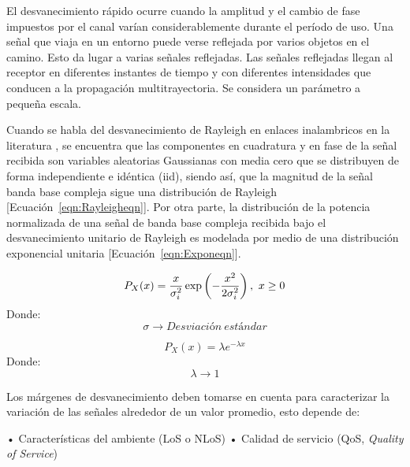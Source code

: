 El desvanecimiento rápido ocurre cuando la amplitud y el cambio de fase impuestos por el canal varían considerablemente durante el período de uso. Una señal que viaja en un entorno puede verse reflejada por varios objetos en el camino. Esto da lugar a varias señales reflejadas. Las señales reflejadas llegan al receptor en diferentes instantes de tiempo y con diferentes intensidades que conducen a la propagación multitrayectoria. Se considera un parámetro a pequeña escala.\newline

Cuando se habla del desvanecimiento de Rayleigh en enlaces inalambricos en la literatura \parencite{RayleighScienceDirect}, se encuentra que las componentes en cuadratura y en fase de la señal recibida son variables aleatorias Gaussianas con media cero que se distribuyen de forma independiente e idéntica (iid), siendo así, que la magnitud de la señal banda base compleja sigue una distribución de Rayleigh [Ecuación~\ref{eqn:Rayleigheqn}]. Por otra parte, la distribución de la potencia normalizada de una señal de banda base compleja recibida bajo el desvanecimiento unitario de Rayleigh es modelada por medio de una distribución exponencial unitaria [Ecuación~\ref{eqn:Exponeqn}]. \label{DesvRayleigC2} \newline 

\begin{equation}
    P_{X}(x) = {x\over\sigma_{i}^{2}}\exp\left(-{x^{2}\over 2\sigma_{i}^{2}}\right),\ x\geq 0
    \label{eqn:Rayleigheqn}
\end{equation}
Donde:
\[\sigma\to Desviación\ estándar\] 

\begin{equation}
    P_{X}(x)=\lambda e^{-\lambda x}
    \label{eqn:Exponeqn}
\end{equation}
Donde:
\[\lambda\to 1\] 

Los márgenes de desvanecimiento deben tomarse en cuenta para caracterizar la variación de las señales alrededor de un valor promedio, esto depende de:\newline

•	Características del ambiente (LoS o NLoS)\newline
•	Calidad de servicio (QoS, \textit{Quality of Service})\newline

